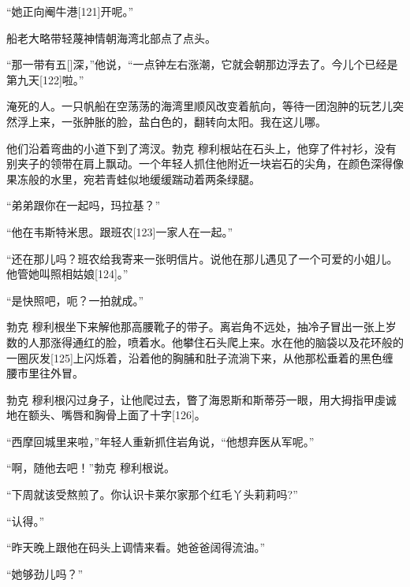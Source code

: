 \documentclass{article}
\begin{document}
“她正向阉牛港[121]开呢。”



船老大略带轻蔑神情朝海湾北部点了点头。



“那一带有五[]深，”他说，“一点钟左右涨潮，它就会朝那边浮去了。今儿个已经是第九天[122]啦。”



淹死的人。一只帆船在空荡荡的海湾里顺风改变着航向，等待一团泡肿的玩艺儿突然浮上来，一张肿胀的脸，盐白色的，翻转向太阳。我在这儿哪。



他们沿着弯曲的小道下到了湾汊。勃克 \cdot 穆利根站在石头上，他穿了件衬衫，没有别夹子的领带在肩上飘动。一个年轻人抓住他附近一块岩石的尖角，在颜色深得像果冻般的水里，宛若青蛙似地缓缓踹动着两条绿腿。



“弟弟跟你在一起吗，玛拉基？”



“他在韦斯特米思。跟班农[123]一家人在一起。”



“还在那儿吗？班农给我寄来一张明信片。说他在那儿遇见了一个可爱的小姐儿。他管她叫照相姑娘[124]。”



“是快照吧，呃？一拍就成。”



勃克 \cdot 穆利根坐下来解他那高腰靴子的带子。离岩角不远处，抽冷子冒出一张上岁数的人那涨得通红的脸，喷着水。他攀住石头爬上来。水在他的脑袋以及花环般的一圈灰发[125]上闪烁着，沿着他的胸脯和肚子流淌下来，从他那松垂着的黑色缠腰市里往外冒。



勃克 \cdot 穆利根闪过身子，让他爬过去，瞥了海恩斯和斯蒂芬一眼，用大拇指甲虔诚地在额头、嘴唇和胸骨上面了十字[126]。



“西摩回城里来啦，”年轻人重新抓住岩角说，“他想弃医从军呢。”



“啊，随他去吧！”勃克 \cdot 穆利根说。



“下周就该受熬煎了。你认识卡莱尔家那个红毛丫头莉莉吗?”



“认得。”



“昨天晚上跟他在码头上调情来看。她爸爸阔得流油。”



“她够劲儿吗？”
\end{document}

